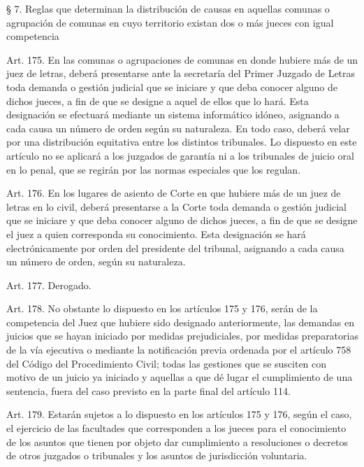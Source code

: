     § 7. Reglas que determinan la distribución de causas en aquellas comunas o agrupación de comunas en cuyo territorio existan dos o más jueces con igual competencia



    Art. 175. En las comunas o agrupaciones de comunas en donde hubiere más de un juez de letras, deberá presentarse ante la secretaría del Primer Juzgado de Letras toda demanda o gestión judicial que se iniciare y que deba conocer alguno de dichos jueces, a fin de que se designe a aquel de ellos que lo hará.
    Esta designación se efectuará mediante un sistema informático idóneo, asignando a cada causa un número de orden según su naturaleza. En todo caso, deberá velar por una distribución equitativa entre los distintos tribunales.
    Lo dispuesto en este artículo no se aplicará a los juzgados de garantía ni a los tribunales de juicio oral en lo penal, que se regirán por las normas especiales que los regulan.



    Art. 176. En los lugares de asiento de Corte en que hubiere más de un juez de letras en lo civil, deberá presentarse a la Corte toda demanda o gestión judicial que se iniciare y que deba conocer alguno de dichos jueces, a fin de que se designe el juez a quien corresponda su conocimiento.
    Esta designación se hará electrónicamente por orden del presidente del tribunal, asignando a cada causa un número de orden, según su naturaleza.


    Art. 177. Derogado.

    Art. 178. No obstante lo dispuesto en los artículos 175 y 176, serán de la competencia del Juez que hubiere sido designado anteriormente, las demandas en juicios que se hayan iniciado por medidas prejudiciales, por medidas preparatorias de la vía ejecutiva o mediante la notificación previa ordenada por el artículo 758 del Código del Procedimiento Civil; todas las gestiones que se susciten con motivo de un juicio ya iniciado y aquellas a que dé lugar el cumplimiento de una sentencia, fuera del caso previsto en la parte final del artículo 114.



    Art. 179. Estarán sujetos a lo dispuesto en los artículos 175 y 176, según el caso, el ejercicio de las facultades que corresponden a los jueces para el conocimiento de los asuntos que tienen por objeto dar cumplimiento a resoluciones o decretos de otros juzgados o tribunales y los asuntos de jurisdicción voluntaria.


